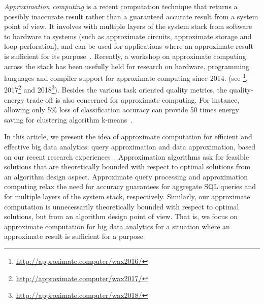 \item[(3)] {\em Approximation computing} is a recent computation technique that returns a possibly inaccurate result rather than a guaranteed accurate result from a system point of view.  It involves with multiple layers of the system stack from software to hardware to systems (such as approximate circuits, approximate storage and loop perforation), and can be used for applications where an approximate result is sufficient for its purpose~\cite{AgrawalCGGNOPSS16,Mittal16b}. Recently, a workshop on approximate computing across the stack has been usefully held for research on hardware, programming languages and compiler support  for approximate computing  since 2014.  (see \footnote{\small \url{http://approximate.computer/wax2016/}}, 2017\footnote{\small  \url{http://approximate.computer/wax2017/}} and 2018\footnote{\small \url{http://approximate.computer/wax2018/}}). Besides the various task oriented quality metrics,  the quality-energy trade-off is also  concerned for approximate computing. For instance, allowing only 5\% loss of classification accuracy can provide 50 times energy saving for clustering algorithm k-means~\cite{Mittal16b}.
\ei

In this article, we present the idea of approximate computation for efficient and effective big data analytics: query approximation and data approximation, based on our recent research experiences~\cite{MaCHW12,ShuaiMaVLDB12,tods-MaCFHW14,LinMZWH17,MaHWLH17,MaFLWCH16,MaFLWCH17,HuAMH16,DuanAMHH16,DuanMAMH17,rankicde2018}.
Approximation algorithms ask for feasible solutions that are theoretically bounded with respect to optimal solutions from an algorithm design aspect.
Approximate query processing and approximation computing relax the need for accuracy guarantees for aggregate SQL queries and for multiple layers of the system stack, respectively. Similarly, our approximate computation is unnecessarily theoretically bounded with respect to optimal solutions, but from an algorithm design point of view. That is, we focus on approximate computation for big data analytics for a situation where an approximate result is sufficient for a purpose.





